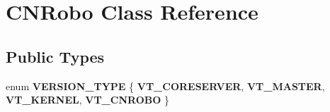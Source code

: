 \hypertarget{classCNRobo}{\section{C\-N\-Robo Class Reference}
\label{classCNRobo}
}
\subsection*{Public Types}
\begin{DoxyCompactItemize}
\item 
enum {\bfseries V\-E\-R\-S\-I\-O\-N\-\_\-\-T\-Y\-P\-E} \{ {\bfseries V\-T\-\_\-\-C\-O\-R\-E\-S\-E\-R\-V\-E\-R}, 
{\bfseries V\-T\-\_\-\-M\-A\-S\-T\-E\-R}, 
{\bfseries V\-T\-\_\-\-K\-E\-R\-N\-E\-L}, 
{\bfseries V\-T\-\_\-\-C\-N\-R\-O\-B\-O}
 \}
\end{DoxyCompactItemize}

